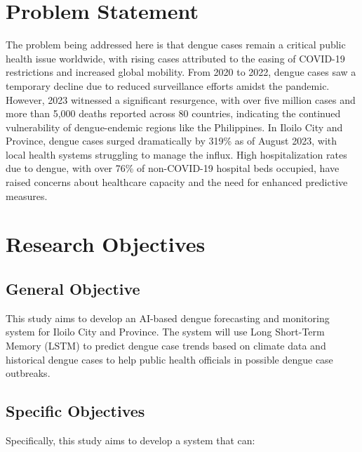\section{Problem Statement}
The problem being addressed here is that dengue cases remain a critical public health issue worldwide,
with rising cases attributed to the easing of COVID-19 restrictions and increased global mobility. 
From 2020 to 2022, dengue cases saw a temporary decline due to reduced surveillance efforts amidst the pandemic. 
However, 2023 witnessed a significant resurgence, with over five million cases and more than 5,000 deaths reported 
across 80 countries, indicating the continued vulnerability of dengue-endemic regions like the Philippines. 
In Iloilo City and Province, dengue cases surged dramatically by 319\% as of August 2023, 
with local health systems struggling to manage the influx. High hospitalization rates due to dengue, with over
76\% of non-COVID-19 hospital beds occupied, have raised concerns about healthcare capacity and the need for enhanced predictive measures. 

\section{Research Objectives}
\label{sec:researchobjectives}

\subsection{General Objective}
\label{sec:generalobjective}

This study aims to develop an AI-based dengue forecasting and monitoring system for Iloilo City and Province. 
The system will use Long Short-Term Memory (LSTM) to predict dengue case trends based on climate data and 
historical dengue cases to help public health officials in possible dengue case outbreaks.


\subsection{Specific Objectives}
\label{sec:specificobjectives}

%
%

Specifically, this study aims to develop a system that can:


